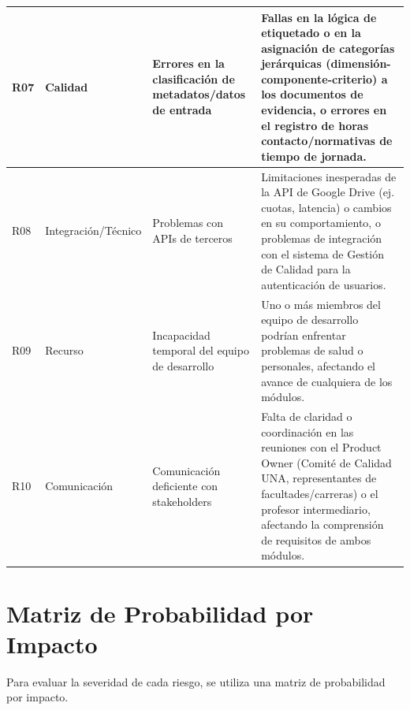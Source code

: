 \begin{longtable}{|l|l|p{}|p{}|}
    \hline
    R07 & Calidad & Errores en la clasificación de metadatos/datos de entrada & Fallas en la lógica de etiquetado o en la asignación de categorías jerárquicas (dimensión-componente-criterio) a los documentos de evidencia, o errores en el registro de horas contacto/normativas de tiempo de jornada. \\
    \hline
    R08 & Integración/Técnico & Problemas con APIs de terceros & Limitaciones inesperadas de la API de Google Drive (ej. cuotas, latencia) o cambios en su comportamiento, o problemas de integración con el sistema de Gestión de Calidad para la autenticación de usuarios. \\
    \hline
    R09 & Recurso & Incapacidad temporal del equipo de desarrollo & Uno o más miembros del equipo de desarrollo podrían enfrentar problemas de salud o personales, afectando el avance de cualquiera de los módulos. \\
    \hline
    R10 & Comunicación & Comunicación deficiente con stakeholders & Falta de claridad o coordinación en las reuniones con el Product Owner (Comité de Calidad UNA, representantes de facultades/carreras) o el profesor intermediario, afectando la comprensión de requisitos de ambos módulos. \\
    \hline
\end{longtable}

\section{Matriz de Probabilidad por Impacto}
Para evaluar la severidad de cada riesgo, se utiliza una matriz de probabilidad por impacto.

